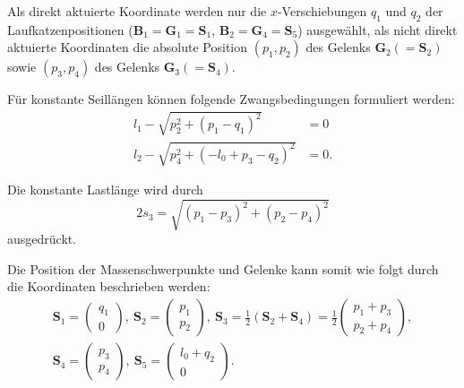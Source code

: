 Als direkt aktuierte Koordinate werden nur die $x$-Verschiebungen $q_1$ und $q_2$ der Laufkatzenpositionen ($\mathbf{B}_1 = \mathbf{G}_1 = \mathbf{S}_1$, $\mathbf{B}_2 = \mathbf{G}_4 = \mathbf{S}_5$) ausgewählt, als nicht direkt aktuierte Koordinaten die absolute Position $(p_1, p_2)$ des Gelenks $\mathbf{G}_2 (= \mathbf{S}_2)$ sowie $(p_3, p_4)$ des Gelenks $\mathbf{G}_3 (=\mathbf{S}_4)$. 

Für konstante Seillängen können folgende Zwangsbedingungen formuliert werden:
\begin{align}
	l_{1} - \sqrt{p_{2}^{2} + \left(p_{1} - q_{1}\right)^{2}} &= 0\\
	l_{2} - \sqrt{p_{4}^{2} + \left(- l_{0} + p_{3} - q_{2}\right)^{2}} &= 0.	
\end{align}

Die konstante Lastlänge wird durch
\begin{equation}
	2 s_{3} = \sqrt{\left(p_{1} - p_{3}\right)^{2} + \left(p_{2} - p_{4}\right)^{2}}
\end{equation}
ausgedrückt.

Die Position der Massenschwerpunkte und Gelenke kann somit wie folgt durch die Koordinaten beschrieben werden:
\begin{align}
	\mathbf{S}_1 =
	\begin{pmatrix}
		q_1 \\
		0
	\end{pmatrix}, 
	\
	\mathbf{S}_2 =
	\begin{pmatrix}
		p_1 \\
		p_2
	\end{pmatrix},
	\
	\mathbf{S}_3 =
	\frac{1}{2}(\mathbf{S}_2 + \mathbf{S}_4) =
	\frac{1}{2}
	\begin{pmatrix}
		p_1 + p_3 \\
		p_2 + p_4
	\end{pmatrix},
	\nonumber \\
	\mathbf{S}_4 =
	\left(\begin{matrix}
		p_3 \\
		p_4
	\end{matrix}\right),
	\
	\mathbf{S}_5 =
	\left(\begin{matrix}
		l_0 + q_2 \\
		0
	\end{matrix}\right).
\end{align}

